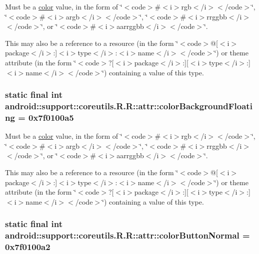 Must be a \hyperlink{classandroid_1_1support_1_1coreutils_1_1_r_1_1color}{color} value, in the form of \char`\"{}$<$code$>$\#$<$i$>$rgb$<$/i$>$$<$/code$>$\char`\"{}, \char`\"{}$<$code$>$\#$<$i$>$argb$<$/i$>$$<$/code$>$\char`\"{}, \char`\"{}$<$code$>$\#$<$i$>$rrggbb$<$/i$>$$<$/code$>$\char`\"{}, or \char`\"{}$<$code$>$\#$<$i$>$aarrggbb$<$/i$>$$<$/code$>$\char`\"{}. 

This may also be a reference to a resource (in the form \char`\"{}$<$code$>$@\mbox{[}$<$i$>$package$<$/i$>$:\mbox{]}$<$i$>$type$<$/i$>$:$<$i$>$name$<$/i$>$$<$/code$>$\char`\"{}) or theme attribute (in the form \char`\"{}$<$code$>$?\mbox{[}$<$i$>$package$<$/i$>$:\mbox{]}\mbox{[}$<$i$>$type$<$/i$>$:\mbox{]}$<$i$>$name$<$/i$>$$<$/code$>$\char`\"{}) containing a value of this type. \hypertarget{classandroid_1_1support_1_1coreutils_1_1_r_1_1attr_bfc3fecc62018513d2f91ef116d103c5}{
\subsubsection[{colorBackgroundFloating}]{\setlength{\rightskip}{0pt plus 5cm}static final int android::support::coreutils.R.R::attr::colorBackgroundFloating = 0x7f0100a5}}
\label{classandroid_1_1support_1_1coreutils_1_1_r_1_1attr_bfc3fecc62018513d2f91ef116d103c5}


Must be a \hyperlink{classandroid_1_1support_1_1coreutils_1_1_r_1_1color}{color} value, in the form of \char`\"{}$<$code$>$\#$<$i$>$rgb$<$/i$>$$<$/code$>$\char`\"{}, \char`\"{}$<$code$>$\#$<$i$>$argb$<$/i$>$$<$/code$>$\char`\"{}, \char`\"{}$<$code$>$\#$<$i$>$rrggbb$<$/i$>$$<$/code$>$\char`\"{}, or \char`\"{}$<$code$>$\#$<$i$>$aarrggbb$<$/i$>$$<$/code$>$\char`\"{}. 

This may also be a reference to a resource (in the form \char`\"{}$<$code$>$@\mbox{[}$<$i$>$package$<$/i$>$:\mbox{]}$<$i$>$type$<$/i$>$:$<$i$>$name$<$/i$>$$<$/code$>$\char`\"{}) or theme attribute (in the form \char`\"{}$<$code$>$?\mbox{[}$<$i$>$package$<$/i$>$:\mbox{]}\mbox{[}$<$i$>$type$<$/i$>$:\mbox{]}$<$i$>$name$<$/i$>$$<$/code$>$\char`\"{}) containing a value of this type. \hypertarget{classandroid_1_1support_1_1coreutils_1_1_r_1_1attr_5e6e8befd4af72608d41645944cffa0a}{
\subsubsection[{colorButtonNormal}]{\setlength{\rightskip}{0pt plus 5cm}static final int android::support::coreutils.R.R::attr::colorButtonNormal = 0x7f0100a2}}
\label{classandroid_1_1support_1_1coreutils_1_1_r_1_1attr_5e6e8befd4af72608d41645944cffa0a}


